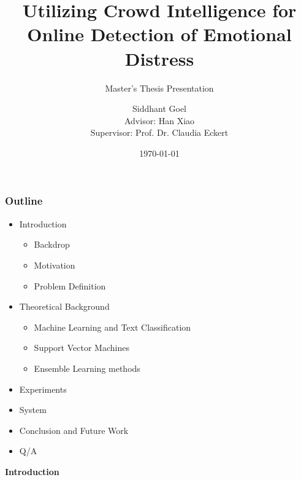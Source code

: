 \documentclass{beamer}
\title{Utilizing Crowd Intelligence for Online Detection of Emotional Distress}
\subtitle{Master's Thesis Presentation}
\author[Siddhant Goel]{Siddhant Goel\\{\small Advisor: Han Xiao\\Supervisor: Prof. Dr. Claudia Eckert}}
\institute{
Chair for IT Security\\
Technische Universit\"at M\"unchen
}
\date{\today}
\begin{document}
    \begin{frame}[plain]
        \titlepage
    \end{frame}
    
    \begin{frame}
        \frametitle{Outline}
        \begin{itemize}
            \item{
            Introduction
            \begin{itemize}
                \item{Backdrop}
                \item{Motivation}
                \item{Problem Definition}
            \end{itemize}
            }
            \pause
            \item{
            Theoretical Background
            \begin{itemize}
                \item{Machine Learning and Text Classification}
                \item{Support Vector Machines}
                \item{Ensemble Learning methods}
            \end{itemize}
            }
            \pause
            \item{Experiments}
            \item{System}
            \item{Conclusion and Future Work}
            \item{Q/A}
        \end{itemize}
    \end{frame}
    
    \begin{frame}
        \begin{center}
            \textbf{Introduction}
        \end{center}
    \end{frame}
    
\end{document}
